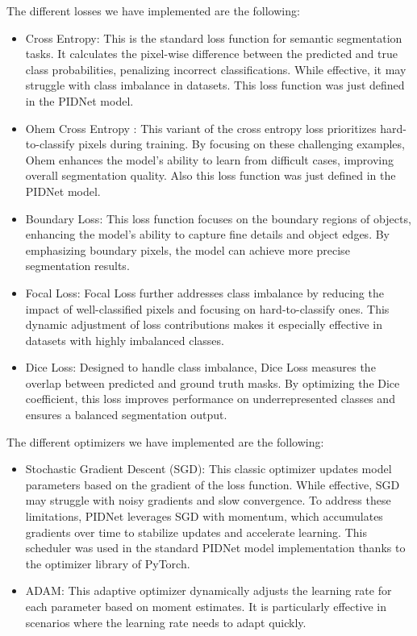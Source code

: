 \documentclass[10pt,twocolumn,letterpaper]{article}
\begin{document}
The different losses we have implemented are the following:
\begin{itemize}
    \item Cross Entropy: This is the standard loss function for semantic segmentation tasks. It calculates the pixel-wise difference between the predicted and true class probabilities, penalizing incorrect classifications. While effective, it may struggle with class imbalance in datasets. This loss function was just defined in the PIDNet model. 
    \item Ohem Cross Entropy : This variant of the cross entropy loss prioritizes hard-to-classify pixels during training. By focusing on these challenging examples, Ohem enhances the model’s ability to learn from difficult cases, improving overall segmentation quality. Also this loss function was just defined in the PIDNet model.
    \item Boundary Loss: This loss function focuses on the boundary regions of objects, enhancing the model’s ability to capture fine details and object edges. By emphasizing boundary pixels, the model can achieve more precise segmentation results. 
    \item Focal Loss:  Focal Loss further addresses class imbalance by reducing the impact of well-classified pixels and focusing on hard-to-classify ones. This dynamic adjustment of loss contributions makes it especially effective in datasets with highly imbalanced classes.
    \item Dice Loss: Designed to handle class imbalance, Dice Loss measures the overlap between predicted and ground truth masks. By optimizing the Dice coefficient, this loss improves performance on underrepresented classes and ensures a balanced segmentation output.
\end{itemize}

The different optimizers we have implemented are the following:
\begin{itemize}
    \item Stochastic Gradient Descent (SGD): This classic optimizer updates model parameters based on the gradient of the loss function. While effective, SGD may struggle with noisy gradients and slow convergence. To address these limitations, PIDNet leverages SGD with momentum, which accumulates gradients over time to stabilize updates and accelerate learning. This scheduler was used in the standard PIDNet model implementation thanks to the optimizer library of PyTorch.
    \item ADAM: This adaptive optimizer dynamically adjusts the learning rate for each parameter based on moment estimates. It is particularly effective in scenarios where the learning rate needs to adapt quickly. 
\end{itemize}
\end{document}
